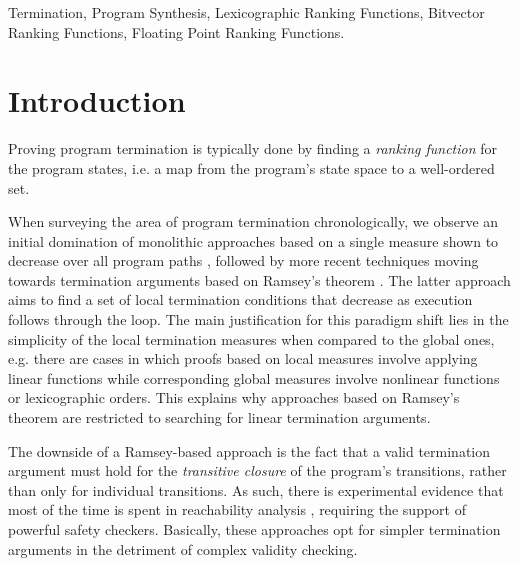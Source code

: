 \documentclass[preprint]{sigplanconf}
\theoremstyle{definition}
\begin{document}
\keywords
Termination, Program Synthesis, Lexicographic Ranking Functions, Bitvector Ranking Functions,
Floating Point Ranking Functions.

\section{Introduction}\label{sec:intro}

Proving program termination is typically done by finding a \emph{ranking function}
for the program states, i.e. a map from the program's state space to a well-ordered set.

When surveying the area of program termination chronologically, we observe an initial domination of  monolithic approaches based on a single measure shown to decrease
over all program paths %
\cite{DBLP:conf/vmcai/P04,DBLP:conf/cav/BradleyMS05}, followed by 
more recent techniques moving towards termination arguments based on Ramsey's theorem \cite{DBLP:conf/lpe/CodishG03,DBLP:conf/lics/PodelskiR04,DBLP:conf/pldi/CookPR06}.
The latter approach aims to find a set of local termination conditions that decrease as execution follows through the loop. %
The main justification for this paradigm shift lies in the simplicity of the local termination measures when compared to the global ones, e.g.
there are cases in which proofs based on local measures involve applying linear functions while corresponding global
measures involve nonlinear functions or lexicographic orders. 
This explains why approaches based on Ramsey's theorem are restricted to searching for linear termination arguments.


The downside of a Ramsey-based approach is the fact that a valid termination argument must hold for the \emph{transitive closure}
of the program's transitions, rather than only for individual transitions. 
As such, there is experimental evidence that most of the time is spent in reachability analysis \cite{DBLP:conf/pldi/CookPR06}, 
requiring the support of powerful safety checkers.
Basically, these approaches opt for simpler termination arguments in the detriment of complex validity checking.
\end{document}
